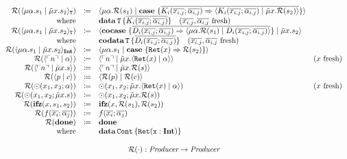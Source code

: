 \[\begin{array}{rcll}
    \redundancy{\cut{\mu\alpha.s_1}{\tilde{\mu}x.s_2}_\mathtt{T}} & \coloneq & \cut{\mu\alpha.\redundancy{s_1}}{\case{\overline{K_i(\overline{x_{i,j}}; \overline{\alpha_{i,j}}) \Rightarrow \cut{K_i(\overline{x_{i,j}}; \overline{\alpha_{i,j}})}{\tilde{\mu}x.\redundancy{s_2}}}}} & \\
    \text{where} &  & \data{T}{\overline{K_i(\overline{x_{i,j}}; \overline{\alpha_{i,j}})}} \quad \fresh{\overline{x_{i,j}}, \overline{\alpha_{i,j}}} & \\
    \redundancy{\cut{\mu\alpha.s_1}{\tilde{\mu}x.s_2}_\mathtt{T}} & \coloneq & \cut{\cocase{\overline{D_i(\overline{x_{i,j}}; \overline{\alpha_{i,j}}) \Rightarrow \cut{\mu\alpha.\redundancy{s_1}}{D_i(\overline{x_{i,j}}; \overline{\alpha_{i,j}})}}}}{\tilde{\mu}x.s_2} & \\
    \text{where} &  & \codata{T}{\overline{D_i(\overline{x_{i,j}}; \overline{\alpha_{i,j}})}} \quad \fresh{\overline{x_{i,j}}, \overline{\alpha_{i,j}}} & \\
    \redundancy{\cut{\mu\alpha.s_1}{\tilde{\mu}x.s_2}_\tyint} & \coloneq & \cut{\mu\alpha.s_1}{\case{\mathtt{Ret}(x) \Rightarrow \redundancy{s_2}}} & \\
    \redundancy{\cut{\lit{n}}{\alpha}} & \coloneq & \cut{\lit{n}}{\tilde{\mu}x.\cut{\mathtt{Ret}(x)}{\alpha}} & \fresh{x} \\
    \redundancy{\cut{\lit{n}}{\tilde{\mu}x.s}} & \coloneq & \cut{\lit{n}}{\tilde{\mu}x.\redundancy{s}} & \\
    \redundancy{\cut{p}{c}} & \coloneq & \cut{\redundancy{p}}{\redundancy{c}} & \\
    \redundancy{\odot(x_1, x_2; \alpha)}{} & \coloneq & \odot(x_1, x_2; \tilde{\mu}x.\cut{\mathtt{Ret}(x)}{\alpha}) & \fresh{x} \\
    \redundancy{\odot(x_1, x_2; \tilde{\mu}x.s)}{} & \coloneq & \odot(x_1, x_2; \tilde{\mu}x.\redundancy{s}) & \\
    \redundancy{\ifz{x}{s_1}{s_2}}{} & \coloneq & \ifz{x}{\redundancy{s_1}}{\redundancy{s_2}} & \\
    \redundancy{f(\overline{x_i}; \overline{\alpha_j})}{} & \coloneq & f(\overline{x_i}; \overline{\alpha_j}) & \\
    \redundancy{\done}{} & \coloneq & \done & \\
    \text{where} & & \data{Cont}{\mathtt{Ret(x : \tyint)}} & \\
    \\
    \multicolumn{4}{c}{\redundancy{\cdot} : \emph{Producer} \rightarrow \emph{Producer}}\\

\end{array}\]
